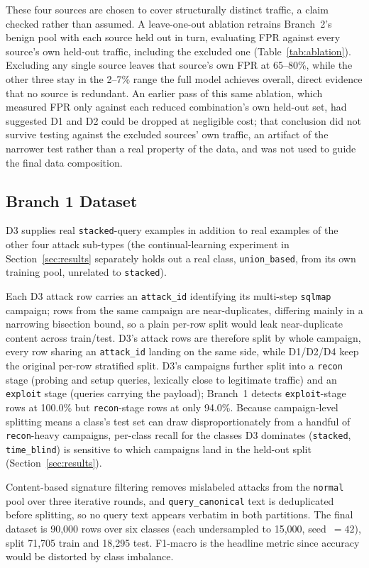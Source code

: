 \documentclass[conference]{IEEEtran}
\begin{document}
These four sources are chosen to cover structurally distinct traffic, a claim checked rather than assumed. A leave-one-out ablation retrains Branch~2's benign pool with each source held out in turn, evaluating FPR against every source's own held-out traffic, including the excluded one (Table~\ref{tab:ablation}). Excluding any single source leaves that source's own FPR at 65--80\%, while the other three stay in the 2--7\% range the full model achieves overall, direct evidence that no source is redundant. An earlier pass of this same ablation, which measured FPR only against each reduced combination's own held-out set, had suggested D1 and D2 could be dropped at negligible cost; that conclusion did not survive testing against the excluded sources' own traffic, an artifact of the narrower test rather than a real property of the data, and was not used to guide the final data composition.

\subsection{Branch 1 Dataset}
D3 supplies real \texttt{stacked}-query examples in addition to real examples of the other four attack sub-types (the continual-learning experiment in Section~\ref{sec:results} separately holds out a real class, \texttt{union\_based}, from its own training pool, unrelated to \texttt{stacked}).

Each D3 attack row carries an \texttt{attack\_id} identifying its multi-step \texttt{sqlmap} campaign; rows from the same campaign are near-duplicates, differing mainly in a narrowing bisection bound, so a plain per-row split would leak near-duplicate content across train/test. D3's attack rows are therefore split by whole campaign, every row sharing an \texttt{attack\_id} landing on the same side, while D1/D2/D4 keep the original per-row stratified split. D3's campaigns further split into a \texttt{recon} stage (probing and setup queries, lexically close to legitimate traffic) and an \texttt{exploit} stage (queries carrying the payload); Branch~1 detects \texttt{exploit}-stage rows at 100.0\% but \texttt{recon}-stage rows at only 94.0\%. Because campaign-level splitting means a class's test set can draw disproportionately from a handful of \texttt{recon}-heavy campaigns, per-class recall for the classes D3 dominates (\texttt{stacked}, \texttt{time\_blind}) is sensitive to which campaigns land in the held-out split (Section~\ref{sec:results}).

Content-based signature filtering removes mislabeled attacks from the \texttt{normal} pool over three iterative rounds, and \texttt{query\_canonical} text is deduplicated before splitting, so no query text appears verbatim in both partitions. The final dataset is 90{,}000 rows over six classes (each undersampled to 15{,}000, seed~$=42$), split 71{,}705 train and 18{,}295 test. F1-macro is the headline metric since accuracy would be distorted by class imbalance.
\end{document}
